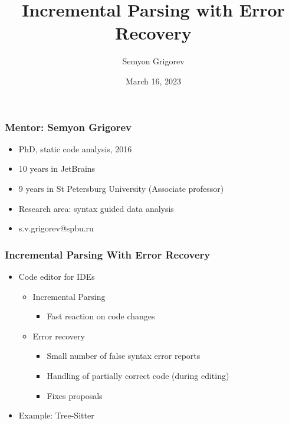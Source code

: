 \documentclass[xcolor=table,aspectratio=169]{beamer}
\title[Incremental parsing]{Incremental Parsing with Error Recovery}
\institute[RRI SPb]{Saint Petersburg Research Center}
\author[Semyon Grigorev]{Semyon Grigorev}
\date{March 16, 2023}
\begin{document}
{
\begin{frame}[fragile]
  \begin{table}
  \centering
  \end{table}
  \titlepage
\end{frame}
}

\begin{frame}[fragile]
  \frametitle{Mentor: Semyon Grigorev}
  \begin{itemize}
    \item PhD, static code analysis, 2016
    \item 10 years in JetBrains
    \item 9 years in St Petersburg University (Associate professor) 
    \item Research area: syntax guided data analysis 
    \item s.v.grigorev@spbu.ru
  \end{itemize}
\end{frame}

\begin{frame}[fragile]
  \frametitle{Incremental Parsing With Error Recovery}
  
  \begin{itemize}
    \item Code editor for IDEs
    \begin{itemize}
      \item Incremental Parsing
        \begin{itemize}
          \item Fast reaction on code changes
        \end{itemize}
      \pause  
      \item Error recovery
      \begin{itemize}
        \item Small number of false syntax error reports        
        \item Handling of partially correct code (during editing)
        \item Fixes proposals
      \end{itemize}
    \end{itemize}
    \pause
    \item Example: Tree-Sitter
    
  \end{itemize}
\end{frame}
\end{document}
